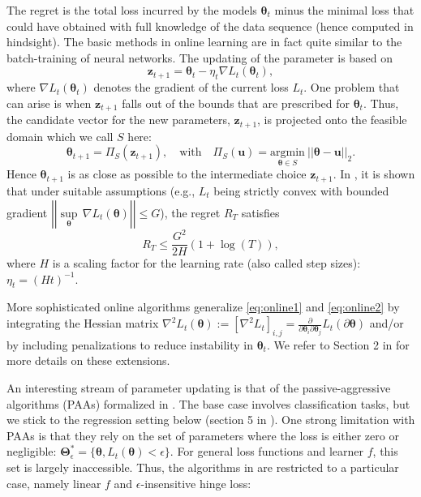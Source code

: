 \documentclass[]{krantz}
\theoremstyle{definition}
\theoremstyle{definition}
\theoremstyle{definition}
\theoremstyle{remark}
\begin{document}
The regret is the total loss incurred by the models
\(\boldsymbol{\theta}_t\) minus the minimal loss that could have
obtained with full knowledge of the data sequence (hence computed in
hindsight). The basic methods in online learning are in fact quite
similar to the batch-training of neural networks. The updating of the
parameter is based on \begin{equation}
\label{eq:online1} 
\textbf{z}_{t+1}=\boldsymbol{\theta}_t-\eta_t\nabla L_t(\boldsymbol{\theta}_t),
\end{equation} where \(\nabla L_t(\boldsymbol{\theta}_t)\) denotes the
gradient of the current loss \(L_t\). One problem that can arise is when
\(\textbf{z}_{t+1}\) falls out of the bounds that are prescribed for
\(\boldsymbol{\theta}_t\). Thus, the candidate vector for the new
parameters, \(\textbf{z}_{t+1}\), is projected onto the feasible domain
which we call \(S\) here: \begin{equation}
\label{eq:online2} 
\boldsymbol{\theta}_{t+1}=\Pi_S(\textbf{z}_{t+1}), \quad \text{with} \quad \Pi_S(\textbf{u}) = \underset{\boldsymbol{\theta}\in S}{\text{argmin}} \ ||\boldsymbol{\theta}-\textbf{u}||_2.
\end{equation} Hence \(\boldsymbol{\theta}_{t+1}\) is as close as
possible to the intermediate choice \(\textbf{z}_{t+1}\). In
\citet{hazan2007logarithmic}, it is shown that under suitable
assumptions (e.g., \(L_t\) being strictly convex with bounded gradient
\(\left|\left|\underset{\boldsymbol{\theta}}{\sup} \, \nabla L_t(\boldsymbol{\theta})\right|\right|\le G\)),
the regret \(R_T\) satisfies \[R_T \le \frac{G^2}{2H}(1+\log(T)),\]
where \(H\) is a scaling factor for the learning rate (also called step
sizes): \(\eta_t=(Ht)^{-1}\).

More sophisticated online algorithms generalize \eqref{eq:online1} and
\eqref{eq:online2} by integrating the Hessian matrix
\(\nabla^2 L_t(\boldsymbol{\theta}):=[\nabla^2 L_t]_{i,j}=\frac{\partial}{\partial \boldsymbol{\theta}_i \partial \boldsymbol{\theta}_j}L_t(\partial \boldsymbol{\theta})\)
and/or by including penalizations to reduce instability in
\(\boldsymbol{\theta}_t\). We refer to Section 2 in
\citet{hoi2018online} for more details on these extensions.

An interesting stream of parameter updating is that of the
passive-aggressive algorithms (PAAs) formalized in
\citet{crammer2006online}. The base case involves classification tasks,
but we stick to the regression setting below (section 5 in
\citet{crammer2006online}). One strong limitation with PAAs is that they
rely on the set of parameters where the loss is either zero or
negligible:
\(\boldsymbol{\Theta}^*_\epsilon=\{\boldsymbol{\theta}, L_t(\boldsymbol{\theta})< \epsilon\}\).
For general loss functions and learner \(f\), this set is largely
inaccessible. Thus, the algorithms in \citet{crammer2006online} are
restricted to a particular case, namely linear \(f\) and
\(\epsilon\)-insensitive hinge loss:
\end{document}
